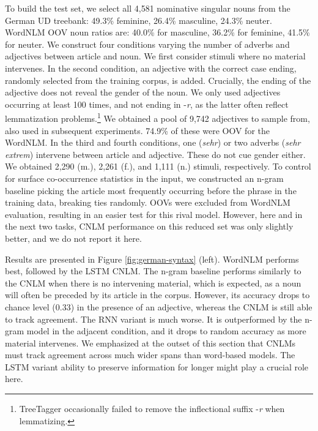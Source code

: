 To build the test set, we select all 4,581 nominative singular nouns
from the German UD treebank: 49.3\% feminine, 26.4\% masculine, 24.3\% neuter. WordNLM OOV noun ratios are: 40.0\% for masculine, 36.2\%
for feminine, 41.5\% for neuter.  We construct four conditions
varying the number of adverbs and adjectives between article and noun.
We first consider stimuli where no material
intervenes. %
In the second condition, an adjective with the correct case ending,
randomly selected from the training corpus, is added. Crucially, the
ending of the adjective does not reveal the gender of the noun.  We
only used adjectives occurring at least 100 times, and not ending in
-\emph{r}, as the latter often reflect lemmatization
problems.\footnote{TreeTagger occasionally failed to remove the
  inflectional suffix -\emph{r} when lemmatizing.}  We obtained a pool
of 9,742 adjectives to sample from, also used in subsequent
experiments.  74.9\% of these were OOV for the WordNLM.  In the third
and fourth conditions, one (\emph{sehr}) or two adverbs (\emph{sehr
  extrem}) intervene between article and adjective. These do not cue
gender either. We obtained 2,290 (m.), 2,261 (f.), and 1,111 (n.)
stimuli, respectively. To control for surface co-occurrence statistics
in the input, we constructed an n-gram baseline picking the article
most frequently occurring before the phrase in the training data,
breaking ties randomly. OOVs were excluded from WordNLM evaluation,
resulting in an easier test for this rival model. However, here and in
the next two tasks, CNLM performance on this reduced set was only
slightly better, and we do not report it here.

Results are presented in Figure \ref{fig:german-syntax}
(left). WordNLM performs best, followed by the LSTM CNLM.  The n-gram
baseline performs similarly to the CNLM when there is no intervening
material, which is expected, as a noun will often be preceded by its
article in the corpus. However, its accuracy drops to chance level
(0.33) in the presence of an adjective, whereas the CNLM is still able
to track agreement. %
The RNN variant is much worse. It is outperformed by the n-gram model
in the adjacent condition, and it drops to random accuracy as more
material intervenes. We emphasized at the outset of this section that
CNLMs must track agreement across much wider spans than
word-based models. The LSTM variant ability to preserve information for
longer might play a crucial role here.

